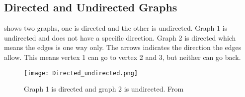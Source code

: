 \subsection{Directed and Undirected Graphs}

 shows two graphs, one is directed and the other is undirected. Graph 1 is undirected and does not have a specific direction. Graph 2 is directed which means the edges is one way only. The arrows indicates the direction the edges allow. This means vertex 1 can go to vertex 2 and 3, but neither can go back. 


\begin{figure}[ht!]
    \centering
    \texttt{[image: Directed\_undirected.png]}
    
    \caption{Graph 1 is directed and graph 2 is undirected. From \cite{dir_pic}}\label{fig:labeled_Directed_undirected}


  \end{figure}